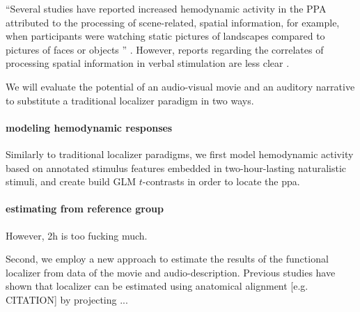 ``Several studies have reported increased hemodynamic activity in the PPA
attributed to the processing of scene-related, spatial information, for example,
when participants were watching static pictures of landscapes compared to
pictures of faces or objects \citep{epstein1998ppa,
epstein1999parahippocampal}'' \citep{haeusler2022processing}.
However, reports regarding the correlates of processing spatial information in
verbal stimulation are less clear \citep{aziz2008modulation}.

%
We will evaluate the potential of an audio-visual movie and an auditory
narrative to substitute a traditional localizer paradigm in two ways.


\paragraph{modeling hemodynamic responses}
%
Similarly to traditional localizer paradigms, we first model hemodynamic
activity based on annotated stimulus features embedded in two-hour-lasting
naturalistic stimuli, and create build GLM $t$-contrasts in order to locate the
\ac{ppa}.


\paragraph{estimating from reference group}




%
However, 2h is too fucking much.

%
Second, we employ a new approach to estimate the results of the functional
localizer from data of the movie and audio-description.
%
Previous studies have shown that localizer can be estimated using anatomical
alignment [e.g. CITATION] by projecting ...
%

